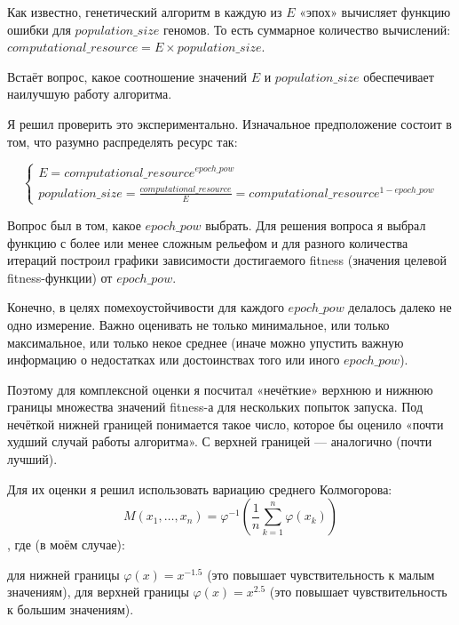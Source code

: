 \documentclass[11pt]{article}
\begin{document}
    Как известно, генетический алгоритм в каждую из $E$ «эпох» вычисляет функцию ошибки для $population\_size$ геномов.
    То есть суммарное количество вычислений: $computational\_resource = E \times population\_size$.

    Встаёт вопрос, какое соотношение значений $E$ и $population\_size$ обеспечивает наилучшую работу алгоритма.

    Я решил проверить это экспериментально.
    Изначальное предположение состоит в том, что разумно распределять ресурс так:

    \begin{equation}
        \begin{cases}
            E = computational\_resource^{epoch\_pow} \\
            population\_size = \frac{computational\_resource}{E} = computational\_resource^{1 - epoch\_pow}
        \end{cases}
    \end{equation}

    Вопрос был в том, какое $epoch\_pow$ выбрать.
    Для решения вопроса я выбрал функцию с более или менее сложным рельефом и для разного количества итераций
    построил графики зависимости достигаемого fitness (значения целевой fitness-функции) от $epoch\_pow$.

    Конечно, в целях помехоустойчивости для каждого $epoch\_pow$ делалось далеко не одно измерение.
    Важно оценивать не только минимальное, или только максимальное, или только некое среднее (иначе можно упустить важную информацию
    о недостатках или достоинствах того или иного $epoch\_pow$).

    Поэтому для комплексной оценки я посчитал «нечёткие» верхнюю и нижнюю границы множества значений fitness-а для нескольких попыток запуска.
    Под нечёткой нижней границей понимается такое число, которое бы оценило «почти худший случай работы алгоритма».
    С верхней границей — аналогично (почти лучший).

    Для их оценки я решил использовать вариацию среднего Колмогорова:
    \begin{equation}
        M(x_{1},\ldots ,x_{n})=\varphi ^{-1}\left({\frac {1}{n}}\sum _{k=1}^{n}\varphi (x_{k})\right)
    \end{equation}
    , где (в моём случае):

    для нижней границы $\varphi(x) = x^{-1.5}$ (это повышает чувствительность к малым значениям),
    для верхней границы $\varphi(x) = x^{2.5}$ (это повышает чувствительность к большим значениям).
\end{document}
